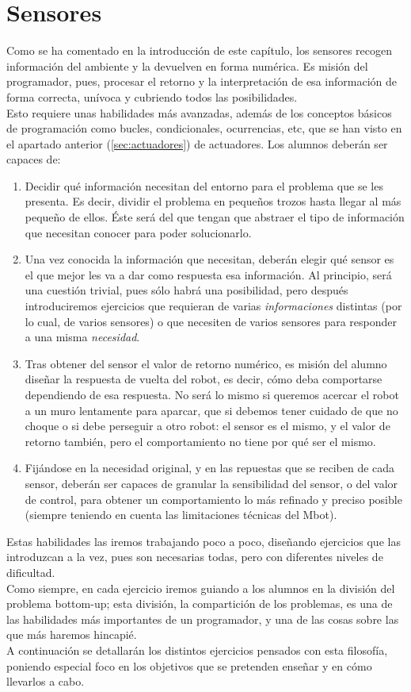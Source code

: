 \section{Sensores}\label{sec:sensores}
Como se ha comentado en la introducción de este capítulo, los sensores recogen información del ambiente y la devuelven en forma numérica. Es misión del programador, pues, procesar el retorno y la interpretación de esa información de forma correcta, unívoca y cubriendo todos las posibilidades. \\
Esto requiere unas habilidades más avanzadas, además de los conceptos básicos de programación como bucles, condicionales, ocurrencias, etc, que se han visto en el apartado anterior (\ref{sec:actuadores}) de actuadores. Los alumnos deberán ser capaces de: \\
\begin{enumerate}
	\item Decidir qué información necesitan del entorno para el problema que se les presenta. Es decir, dividir el problema en pequeños trozos hasta llegar al más pequeño de ellos. Éste será del que tengan que abstraer el tipo de información que necesitan conocer para poder solucionarlo.
	\item Una vez conocida la información que necesitan, deberán elegir qué sensor es el que mejor les va a dar como respuesta esa información. Al principio, será una cuestión trivial, pues sólo habrá una posibilidad, pero después introduciremos ejercicios que requieran de varias \textit{informaciones} distintas (por lo cual, de varios sensores) o que necesiten de varios sensores para responder a una misma \textit{necesidad}.
	\item Tras obtener del sensor el valor de retorno numérico, es misión del alumno diseñar la respuesta de vuelta del robot, es decir, cómo deba comportarse dependiendo de esa respuesta. No será lo mismo si queremos acercar el robot a un muro lentamente para aparcar, que si debemos tener cuidado de que no choque o si debe perseguir a otro robot: el sensor es el mismo, y el valor de retorno también, pero el comportamiento no tiene por qué ser el mismo. 	
	\item Fijándose en la necesidad original, y en las repuestas que se reciben de cada sensor, deberán ser capaces de granular la sensibilidad del sensor, o del valor de control, para obtener un comportamiento lo más refinado y preciso posible (siempre teniendo en cuenta las limitaciones técnicas del Mbot).
\end{enumerate}
Estas habilidades las iremos trabajando poco a poco, diseñando ejercicios que las introduzcan a la vez, pues son necesarias todas, pero con diferentes niveles de dificultad.\\
Como siempre, en cada ejercicio iremos guiando a los alumnos en la división del problema bottom-up; esta división, la compartición de los problemas, es una de las habilidades más importantes de un programador, y una de las cosas sobre las que más haremos hincapié.\\
A continuación se detallarán los distintos ejercicios pensados con esta filosofía, poniendo especial foco en los objetivos que se pretenden enseñar y en cómo llevarlos a cabo.

